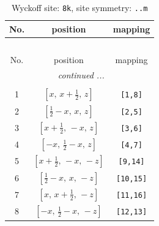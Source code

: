\documentclass[fleqn,8pt]{jsarticle}
\begin{document}
\begin{longtable}{ccc}
\caption{Wyckoff site: {\tt 8k}, site symmetry: {\tt ..m}}
 \\
 \hline \hline
No. & position & mapping \\ \hline \endfirsthead

\multicolumn{2}{l}{\tablename\ \thetable{}} \\
 \hline \hline
No. & position & mapping \\ \hline \endhead

 \hline \hline
\multicolumn{2}{r}{\footnotesize\it continued ...} \\ \endfoot

 \hline \hline
\multicolumn{2}{r}{} \\ \endlastfoot

1 & $\left[ x,\, x + \frac{1}{2},\, z \right]$ & {\tt [1,8]} \\ \hline
2 & $\left[ \frac{1}{2} - x,\, x,\, z \right]$ & {\tt [2,5]} \\ \hline
3 & $\left[ x + \frac{1}{2},\, - x,\, z \right]$ & {\tt [3,6]} \\ \hline
4 & $\left[ - x,\, \frac{1}{2} - x,\, z \right]$ & {\tt [4,7]} \\ \hline
5 & $\left[ x + \frac{1}{2},\, - x,\, - z \right]$ & {\tt [9,14]} \\ \hline
6 & $\left[ \frac{1}{2} - x,\, x,\, - z \right]$ & {\tt [10,15]} \\ \hline
7 & $\left[ x,\, x + \frac{1}{2},\, - z \right]$ & {\tt [11,16]} \\ \hline
8 & $\left[ - x,\, \frac{1}{2} - x,\, - z \right]$ & {\tt [12,13]} \\
\end{longtable}
\renewcommand{\arraystretch}{1.2}
\end{document}
